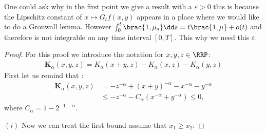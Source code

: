 \begin{remark}
    One could ask why in the first point we give a result with a $\varepsilon > 0$ this is because the Lipschitz constant of $x \mapsto G_tf(x,y)$ appears in a place where we would like to do a Gronwall lemma. However $\int_0^t \brac{1,\mu_s} \dd s = t\brac{1,\mu} + o(t)$ and therefore is not integrable on any time interval $[0,T]$. This why we need this $\varepsilon$. 
\end{remark}
\begin{proof}
    For this proof we introduce the notation for $x,y,z \in \RRP$:
    \begin{align*}
        \mathbf{K}_\alpha(x,y,z) = K_\alpha(x+y,z) - K_\alpha(x,z) -K_\alpha(y,z)
    \end{align*}
    First let us remind that :
    \begin{align*}
        \mathbf{K}_\alpha(x,y,z) &= -z^{-\alpha} + (x+y)^{-\alpha} - x^{-\alpha} - y^{-\alpha}\\
        &\leq -z^{-\alpha} - C_\alpha(x^{-\alpha} + y^{-\alpha}) \leq 0,
    \end{align*}
    where $C_\alpha = 1-2^{-1-\alpha}$.
    
    $(i)$ Now we can treat the first bound assume that $x_1 \geq x_2$:
    

\end{proof}
